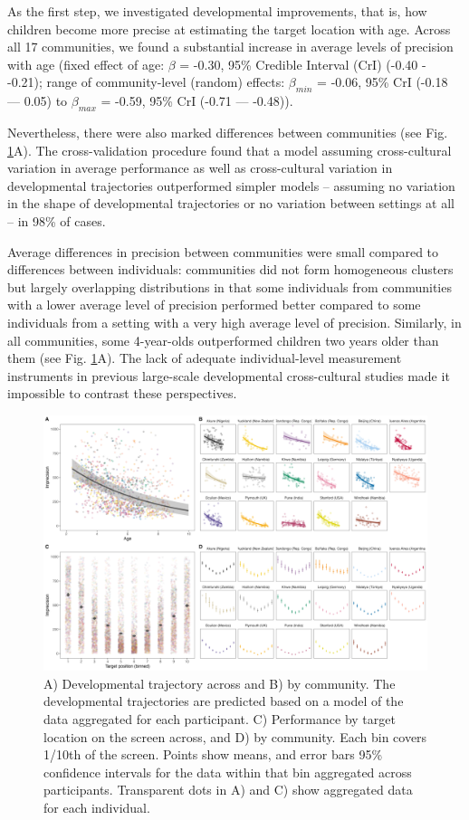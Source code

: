\documentclass[
  man,floatsintext]{apa7}
\begin{document}
As the first step, we investigated developmental improvements, that is, how children become more precise at estimating the target location with age. Across all 17 communities, we found a substantial increase in average levels of precision with age (fixed effect of age: \(\beta\) = -0.30, 95\% Credible Interval (CrI) (-0.40 - -0.21); range of community-level (random) effects: \(\beta_{min}\) = -0.06, 95\% CrI (-0.18 --- 0.05) to \(\beta_{max}\) = -0.59, 95\% CrI (-0.71 --- -0.48)).

Nevertheless, there were also marked differences between communities (see Fig. \ref{fig:fig2}A). The cross-validation procedure found that a model assuming cross-cultural variation in average performance as well as cross-cultural variation in developmental trajectories outperformed simpler models -- assuming no variation in the shape of developmental trajectories or no variation between settings at all -- in 98\% of cases.

Average differences in precision between communities were small compared to differences between individuals: communities did not form homogeneous clusters but largely overlapping distributions in that some individuals from communities with a lower average level of precision performed better compared to some individuals from a setting with a very high average level of precision. Similarly, in all communities, some 4-year-olds outperformed children two years older than them (see Fig. \ref{fig:fig2}A). The lack of adequate individual-level measurement instruments in previous large-scale developmental cross-cultural studies made it impossible to contrast these perspectives.

\begin{figure}

{\centering \includegraphics[width=1\linewidth]{../figures/pvis_pred} 

}

\caption{A) Developmental trajectory across and B) by community. The developmental trajectories are predicted based on a model of the data aggregated for each participant. C) Performance by target location on the screen across, and D) by community. Each bin covers 1/10th of the screen. Points show means, and error bars 95\% confidence intervals for the data within that bin aggregated across participants. Transparent dots in A) and C) show aggregated data for each individual.}\label{fig:fig2}
\end{figure}
\end{document}
